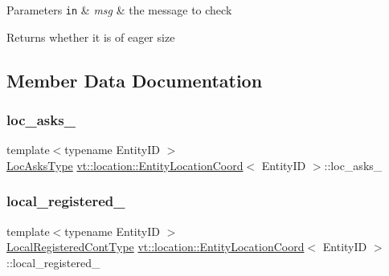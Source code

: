 \begin{DoxyParams}[1]{Parameters}
\mbox{\tt in}  & {\em msg} & the message to check\\
\hline
\end{DoxyParams}
\begin{DoxyReturn}{Returns}
whether it is of eager size 
\end{DoxyReturn}


\subsection{Member Data Documentation}
\mbox{\label{structvt_1_1location_1_1_entity_location_coord_a52abbeb79fc2d24889a05ac87ad6e7f5}} 
\subsubsection{\texorpdfstring{loc\+\_\+asks\+\_\+}{loc\_asks\_}}
{\footnotesize\ttfamily template$<$typename Entity\+ID $>$ \\
\hyperlink{structvt_1_1location_1_1_entity_location_coord_a492ca5404229c05923f69bae396f2ac4}{Loc\+Asks\+Type} \hyperlink{structvt_1_1location_1_1_entity_location_coord}{vt\+::location\+::\+Entity\+Location\+Coord}$<$ Entity\+ID $>$\+::loc\+\_\+asks\+\_\+\hspace{0.3cm}{\ttfamily [private]}}

\mbox{\label{structvt_1_1location_1_1_entity_location_coord_a17f116f6581c4f67c2c5450db40f70a6}} 
\subsubsection{\texorpdfstring{local\+\_\+registered\+\_\+}{local\_registered\_}}
{\footnotesize\ttfamily template$<$typename Entity\+ID $>$ \\
\hyperlink{structvt_1_1location_1_1_entity_location_coord_a90aee70e2e80fe4c1abf1d0616113708}{Local\+Registered\+Cont\+Type} \hyperlink{structvt_1_1location_1_1_entity_location_coord}{vt\+::location\+::\+Entity\+Location\+Coord}$<$ Entity\+ID $>$\+::local\+\_\+registered\+\_\+\hspace{0.3cm}{\ttfamily [private]}}

